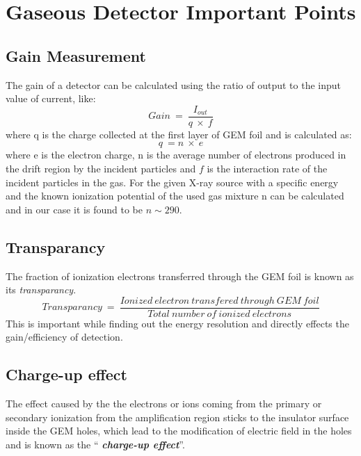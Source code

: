 \chapter{Gaseous Detector Important Points} %
\label{cha:gaseous_detector_important_points}

\section{Gain Measurement} %
\label{sec:gain_measurement}
The gain of a detector can be calculated using the ratio of output to the input value of current, like:
\begin{equation}
    Gain~=~\frac{I_{out}}{q~\times~f}
\end{equation}
where q is the charge collected at the first layer of GEM foil and is calculated as:
\begin{equation}
    q~= n~\times~e
\end{equation}
where e is the electron charge, n is the average number of electrons produced in the drift region by the incident particles and $f$ is the interaction rate of the incident particles in the gas. For the given X-ray source with a specific energy and the known ionization potential of the used gas mixture n can be calculated and in our case it is found to be $n \sim 290$.

\section{Transparancy} %
\label{sec:transparancy}
The fraction of ionization electrons transferred through the GEM foil is known as its \textit{transparancy}. 
\begin{equation}
	Transparancy~=~\frac{Ionized~electron~transfered~through~GEM~foil}{Total~number~of~ionized~electrons}
\end{equation}
This is important while finding out the energy resolution and directly effects the gain/efficiency of detection.

\section{Charge-up effect} %
\label{sec:charge_up_effect}

The effect caused by the the electrons or ions coming from the primary or secondary ionization from the amplification region sticks to the insulator surface inside the GEM holes, which lead to the modification of electric field in the holes and is known as the ``\textit{ \textbf{charge-up effect}}''.

